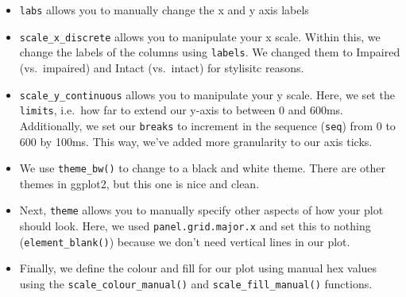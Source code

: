 \documentclass[
]{book}
\providecommand{\tightlist}{%
  \setlength{\itemsep}{0pt}\setlength{\parskip}{0pt}}
\begin{document}
\begin{itemize}
\tightlist
\item
  \texttt{labs} allows you to manually change the x and y axis labels
\item
  \texttt{scale\_x\_discrete} allows you to manipulate your x scale. Within this, we change the labels of the columns using \texttt{labels}. We changed them to Impaired (vs.~impaired) and Intact (vs.~intact) for stylisitc reasons.
\item
  \texttt{scale\_y\_continuous} allows you to manipulate your y scale. Here, we set the \texttt{limits}, i.e.~how far to extend our y-axis to between 0 and 600ms. Additionally, we set our \texttt{breaks} to increment in the sequence (\texttt{seq}) from 0 to 600 by 100ms. This way, we've added more granularity to our axis ticks.
\item
  We use \texttt{theme\_bw()} to change to a black and white theme. There are other themes in ggplot2, but this one is nice and clean.
\item
  Next, \texttt{theme} allows you to manually specify other aspects of how your plot should look. Here, we used \texttt{panel.grid.major.x} and set this to nothing (\texttt{element\_blank()}) because we don't need vertical lines in our plot.
\item
  Finally, we define the colour and fill for our plot using manual hex values using the \texttt{scale\_colour\_manual()} and \texttt{scale\_fill\_manual()} functions.
\end{itemize}
\end{document}
